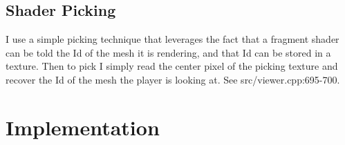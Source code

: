 \documentclass[oneside]{book}
\begin{document}
    \subsection{Shader Picking} \label{picking}
      I use a simple picking technique that leverages the fact that a fragment shader can be told the Id of the mesh it is rendering, and that Id can be stored in a texture. Then to pick I simply read the center pixel of the picking texture and recover the Id of the mesh the player is looking at. See src/viewer.cpp:695-700.



  \section{Implementation}





    \nocite{*}
    {}
    
\newpage





\end{document}
